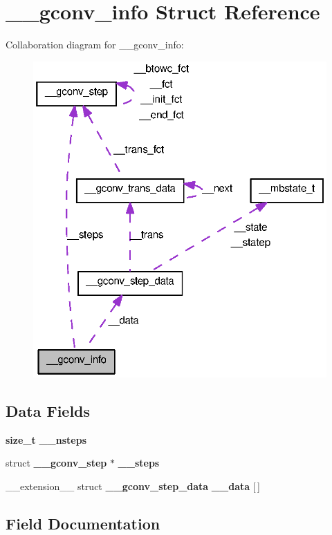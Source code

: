 \section{\_\-\_\-gconv\_\-info Struct Reference}
\label{struct____gconv__info}


Collaboration diagram for \_\-\_\-gconv\_\-info:
\nopagebreak
\begin{figure}[H]
\begin{center}
\leavevmode
\includegraphics[width=321pt]{struct____gconv__info__coll__graph}
\end{center}
\end{figure}
\subsection*{Data Fields}
\begin{DoxyCompactItemize}
\item 
{\bf size\_\-t} {\bf \_\-\_\-nsteps}
\item 
struct {\bf \_\-\_\-gconv\_\-step} $\ast$ {\bf \_\-\_\-steps}
\item 
\_\-\_\-extension\_\-\_\- struct {\bf \_\-\_\-gconv\_\-step\_\-data} {\bf \_\-\_\-data} [$\,$]
\end{DoxyCompactItemize}


\subsection{Field Documentation}
